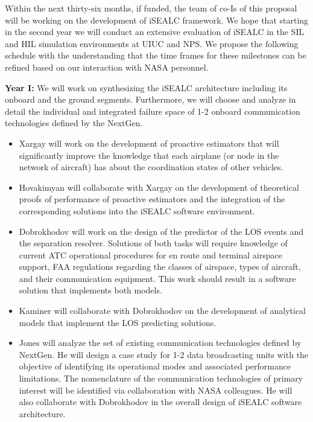 \documentclass[letter,onecolumn,12pt]{aiaa-tc}
\newcommand{\1}{1_n}
\begin{document}
Within the next thirty-six months, if funded, the team of co-Is of this proposal will be working on the development of iSEALC framework. We hope that starting in the second year we will conduct an extensive evaluation of iSEALC in the SIL and HIL simulation environments at UIUC and NPS. We propose the following schedule with the understanding that the time frames for these milestones can be refined based on our interaction with NASA personnel.

\textbf{Year I:} We will work on synthesizing the iSEALC architecture including its onboard and the ground segments.
Furthermore, we will choose and analyze in detail the individual and integrated failure space of 1-2 onboard communication
technologies defined by the NextGen.
\vspace{-3mm}
\begin{itemize}
\setlength{\itemsep}{-4pt}
    \item Xargay will work on the development of proactive estimators that will significantly improve the knowledge that each airplane (or node in the network of aircraft) has about the coordination states of other vehicles.

    \item Hovakimyan will collaborate with Xargay on the development of theoretical proofs of performance of proactive estimators and the integration of the corresponding solutions into the iSEALC software environment.

    \item Dobrokhodov will work on the design of the predictor of the LOS events and the separation resolver. Solutions of both tasks will require knowledge of current ATC operational procedures for en route and terminal airspace support, FAA regulations regarding the classes of airspace, types  of aircraft, and their communication equipment. This work should result in a software solution that implements both models.

    \item Kaminer will collaborate with Dobrokhodov on the development of analytical models that implement the LOS predicting solutions.

    \item Jones will analyze the set of existing communication technologies defined by NextGen. He will design a case study for 1-2 data broadcasting units with the objective of identifying its operational modes and associated performance limitations. The nomenclature of the communication technologies of primary interest will be identified via collaboration with NASA colleagues. He will also collaborate with Dobrokhodov in the overall design of iSEALC software architecture.
\end{itemize}
\vspace{-2mm}
\end{document}
